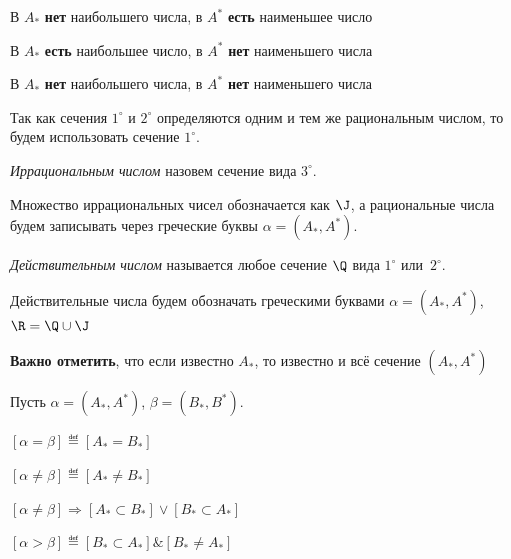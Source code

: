 \begin{properties}
\item В \(A_*\) \textbf{нет} наибольшего числа, в \(A^*\) \textbf{есть} наименьшее число
\item В \(A_*\) \textbf{есть} наибольшее число, в \(A^*\) \textbf{нет} наименьшего числа
\item В \(A_*\) \textbf{нет} наибольшего числа, в \(A^*\) \textbf{нет} наименьшего числа
\end{properties}

Так как сечения \(1^\circ\) и \(2^\circ\) определяются одним и тем же рациональным числом,
то будем использовать сечение \(1^\circ\).

\begin{definition}
\textit{Иррациональным числом} назовем сечение вида \(3^\circ\).
\end{definition}

Множество иррациональных чисел обозначается как \(\J\),
а рациональные числа будем записывать через греческие буквы \(\alpha = \left(A_*, A^*\right)\).

\begin{definition}
\textit{Действительным числом} называется любое сечение \(\Q\) вида \(1^\circ\) или~\(2^\circ\).
\end{definition}

Действительные числа будем обозначать греческими буквами \(\alpha =
\left(A_*, A^*\right)\), \(\R = \Q \cup \J\)

\textbf{Важно отметить}, что если известно \(A_*\), то известно и всё сечение
\(\left(A_*, A^*\right)\) 

Пусть \(\alpha = \left(A_*, A^*\right)\), \(\beta = \left(B_*, B^*\right)\).

\begin{definition}
\(
    \left[\alpha = \beta\right] \eqdef \left[A_* = B_*\right]
\)
\end{definition}

\begin{definition}
\(
    \left[\alpha \not = \beta\right] \eqdef \left[A_* \not = B_*\right]
\)
\end{definition}

\begin{proposition}
\(
    \left[\alpha \not = \beta\right] \Rightarrow \left[A_* \subset B_*\right] \lor
    \left[B_* \subset A_*\right]
\)
\end{proposition}

\begin{definition}
\(
    \left[\alpha > \beta\right] \eqdef \left[B_* \subset A_*\right] \&
    \left[B_* \not = A_*\right]
\)
\end{definition}